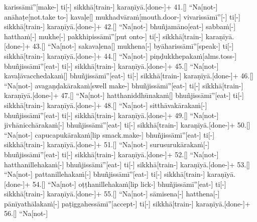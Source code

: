 \documentclass[12pt]{article}
\begin{document}
\begin{paracol}{2}
\begin{column}
\begin{flushleft}
karissāmī”[make-] ti[-\NUL{\GMU{}}] sikkhā[train-] karaṇīyā.[done-]+ 41.[] “Na[not-] anāhaṭe[not.take to-] kavaḷe[] mukhadvāraṁ[mouth.door-] vivarissāmī”[-\NUL{\GMU{}}] ti[-\NUL{\GMU{}}] sikkhā[train-] karaṇīyā.[done-]+ 42.[] “Na[not-] bhuñjamāno[eat-] sabbaṁ[-\NUL{\GMU{}}] hatthaṁ[-\NUL{\GMU{}}] mukhe[-\NUL{\GMU{}}] pakkhipissāmī”[put onto-] ti[-\NUL{\GMU{}}] sikkhā[train-] karaṇīyā.[done-]+ 43.[] “Na[not-] sakavaḷena[] mukhena[-\NUL{\GMU{}}] byāharissāmī”[speak-] ti[-\NUL{\GMU{}}] sikkhā[train-] karaṇīyā.[done-]+ 44.[] “Na[not-] piṇḍukkhepakaṁ[alms.toss-] bhuñjissāmī”[eat-] ti[-\NUL{\GMU{}}] sikkhā[train-] karaṇīyā.[done-]+ 45.[] “Na[not-] kavaḷāvacchedakaṁ[] bhuñjissāmī”[eat-] ti[-\NUL{\GMU{}}] sikkhā[train-] karaṇīyā.[done-]+ 46.[] “Na[not-] avagaṇḍakārakaṁ[swell make-] bhuñjissāmī”[eat-] ti[-\NUL{\GMU{}}] sikkhā[train-] karaṇīyā.[done-]+ 47.[] “Na[not-] hatthaniddhūnakaṁ[] bhuñjissāmī”[eat-] ti[-\NUL{\GMU{}}] sikkhā[train-] karaṇīyā.[done-]+ 48.[] “Na[not-] sitthāvakārakaṁ[-\NUL{\GMU{}}] bhuñjissāmī”[eat-] ti[-\NUL{\GMU{}}] sikkhā[train-] karaṇīyā.[done-]+ 49.[] “Na[not-] jivhānicchārakaṁ[-\NUL{\GMU{}}] bhuñjissāmī”[eat-] ti[-\NUL{\GMU{}}] sikkhā[train-] karaṇīyā.[done-]+ 50.[] “Na[not-] capucapukārakaṁ[lip smack.make-] bhuñjissāmī”[eat-] ti[-\NUL{\GMU{}}] sikkhā[train-] karaṇīyā.[done-]+ 51.[] “Na[not-] surusurukārakaṁ[-\NUL{\GMU{}}] bhuñjissāmī”[eat-] ti[-\NUL{\GMU{}}] sikkhā[train-] karaṇīyā.[done-]+ 52.[] “Na[not-] hatthanillehakaṁ[-\NUL{\GMU{}}] bhuñjissāmī”[eat-] ti[-\NUL{\GMU{}}] sikkhā[train-] karaṇīyā.[done-]+ 53.[] “Na[not-] pattanillehakaṁ[-\NUL{\GMU{}}] bhuñjissāmī”[eat-] ti[-\NUL{\GMU{}}] sikkhā[train-] karaṇīyā.[done-]+ 54.[] “Na[not-] oṭṭhanillehakaṁ[lip lick-\NUL{\GMU{}}] bhuñjissāmī”[eat-] ti[-\NUL{\GMU{}}] sikkhā[train-] karaṇīyā.[done-]+ 55.[] “Na[not-] sāmisena[-\NUL{\GMU{}}] hatthena[-\NUL{\GMU{}}] pānīyathālakaṁ[-\NUL{\GMU{}}] paṭiggahessāmī”[accept-] ti[-\NUL{\GMU{}}] sikkhā[train-] karaṇīyā.[done-]+ 56.[] “Na[not-] 
\end{flushleft}
\end{column}
\end{paracol}
\end{document}
